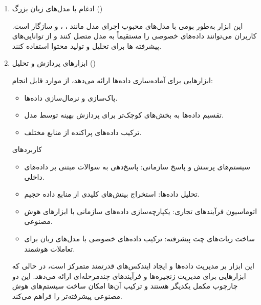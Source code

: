 \documentclass[11pt, a4paper, oneside]{book}
\begin{document}
\begin{enumerate}
					
					\item {\large ادغام با مدل‌های زبان بزرگ ()} \par
					
					این ابزار به‌طور بومی با مدل‌های محبوب اجرای مدل مانند ، ، و  سازگار است. کاربران می‌توانند داده‌های خصوصی را مستقیماً به مدل متصل کنند و از توانایی‌های پیشرفته ها برای تحلیل و تولید محتوا استفاده کنند.
					
					
					\item {\large ابزارهای پردازش و تحلیل ()} \par
					
					ابزارهایی برای آماده‌سازی داده‌ها ارائه می‌دهد، از موارد قابل انجام:
					
					\begin{itemize}
						
						\item پاک‌سازی و نرمال‌سازی داده‌ها.
						
						\item تقسیم داده‌ها به بخش‌های کوچک‌تر برای پردازش بهینه توسط مدل.
						
						\item ترکیب داده‌های پراکنده از منابع مختلف.
						
					\end{itemize}
					
					{\large کاربردهای } \par
					
					\begin{itemize}
						
						\item {\large سیستم‌های پرسش و پاسخ سازمانی}:
						پاسخ‌دهی به سوالات مبتنی بر داده‌های داخلی.
						
						\item {\large تحلیل داده‌ها}:
						استخراج بینش‌های کلیدی از منابع داده حجیم.
						
						\item {\large اتوماسیون فرآیندهای تجاری}:
						یکپارچه‌سازی داده‌های سازمانی با ابزارهای هوش مصنوعی.
						
						\item {\large ساخت ربات‌های چت پیشرفته}:
						ترکیب داده‌های خصوصی با مدل‌های زبان برای تعاملات هوشمند.	
						
					\end{itemize}
					
					این ابزار بر مدیریت داده‌ها و ایجاد ایندکس‌های قدرتمند متمرکز است، در حالی که  ابزارهایی برای مدیریت زنجیره‌ها و فرآیندهای چندمرحله‌ای ارائه می‌دهد. این دو چارچوب مکمل یکدیگر هستند و ترکیب آن‌ها امکان ساخت سیستم‌های هوش مصنوعی پیشرفته‌تر را فراهم می‌کند.
					
					
				\end{enumerate}
			
\end{document}
